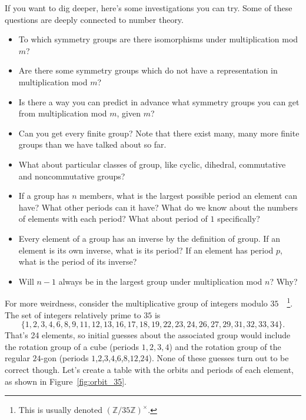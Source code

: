 \documentclass[../gatm.tex]{subfiles}
\begin{document}
If you want to dig deeper, here's some investigations you can try. Some of these questions are deeply connected to number theory.
\begin{itemize}
\item To which symmetry groups are there isomorphisms under multiplication mod $m$?
\item Are there some symmetry groups which do not have a representation in multiplication mod $m$?
\item Is there a way you can predict in advance what symmetry groups you can get from multiplication mod $m$, given $m$?
\item Can you get every finite group? Note that there exist many, many more finite groups than we have talked about so far.
\item What about particular classes of group, like cyclic, dihedral, commutative and noncommutative groups?
\item If a group has $n$ members, what is the largest possible period an element can have? What other periods can it have? What do we know about the numbers of elements with each period? What about period of $1$ specifically?
\item Every element of a group has an inverse by the definition of group. If an element is its own inverse, what is its period? If an element has period $p$, what is the period of its inverse?
\item Will $n-1$ always be in the largest group under multiplication mod $n$? Why?
\end{itemize}
For more weirdness, consider the multiplicative group of integers modulo $35\quad$\footnote{This is usually denoted $(\mathbb{Z}/35\mathbb{Z})^\times$.}. The set of integers relatively prime to $35$ is $$\{1,2,3,4,6,8,9,11,12,13,16,17,18,19,22,23,24,26,27,29,31,32,33,34\}.$$ That's 24 elements, so initial guesses about the associated group would include the rotation group of a cube (periods $1,2,3,4$) and the rotation group of the regular $24$-gon (periods $1$,$2$,$3$,$4$,$6$,$8$,$12$,$24$). None of these guesses turn out to be correct though. Let's create a table with the orbits and periods of each element, as shown in Figure~\ref{fig:orbit_35}.
\end{document}
